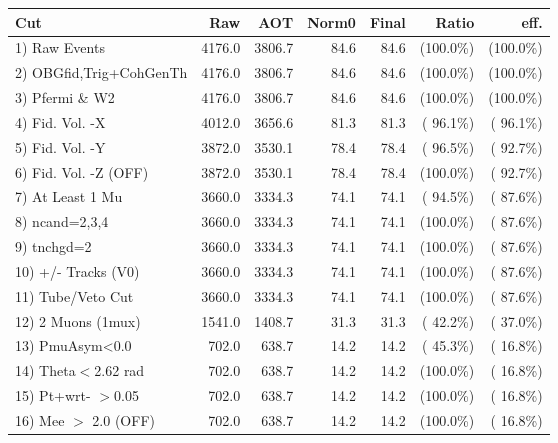  \begin{table}[h!]\centering
 \begin{tabular}{||l||r|r|r|r|r|r||}
 \hline
 \hline
 Cut & Raw & AOT & Norm0 & Final & Ratio & eff.       \\
 \hline
  1) Raw Events           &       4176.0 &       3806.7 &         84.6 &         84.6 & (100.0\%) & (100.0\%) \\
  2) OBGfid,Trig+CohGenTh &       4176.0 &       3806.7 &         84.6 &         84.6 & (100.0\%) & (100.0\%) \\
  3) Pfermi \& W2         &       4176.0 &       3806.7 &         84.6 &         84.6 & (100.0\%) & (100.0\%) \\
  4) Fid. Vol. -X         &       4012.0 &       3656.6 &         81.3 &         81.3 & ( 96.1\%) & ( 96.1\%) \\
  5) Fid. Vol. -Y         &       3872.0 &       3530.1 &         78.4 &         78.4 & ( 96.5\%) & ( 92.7\%) \\
  6) Fid. Vol. -Z (OFF)   &       3872.0 &       3530.1 &         78.4 &         78.4 & (100.0\%) & ( 92.7\%) \\
  7) At Least 1 Mu        &       3660.0 &       3334.3 &         74.1 &         74.1 & ( 94.5\%) & ( 87.6\%) \\
  8) ncand=2,3,4          &       3660.0 &       3334.3 &         74.1 &         74.1 & (100.0\%) & ( 87.6\%) \\
  9) tnchgd=2             &       3660.0 &       3334.3 &         74.1 &         74.1 & (100.0\%) & ( 87.6\%) \\
 10) +/- Tracks (V0)      &       3660.0 &       3334.3 &         74.1 &         74.1 & (100.0\%) & ( 87.6\%) \\
 11) Tube/Veto Cut        &       3660.0 &       3334.3 &         74.1 &         74.1 & (100.0\%) & ( 87.6\%) \\
 12) 2 Muons (1mux)       &       1541.0 &       1408.7 &         31.3 &         31.3 & ( 42.2\%) & ( 37.0\%) \\
 13) PmuAsym<0.0          &        702.0 &        638.7 &         14.2 &         14.2 & ( 45.3\%) & ( 16.8\%) \\
 14) Theta$<$2.62 rad     &        702.0 &        638.7 &         14.2 &         14.2 & (100.0\%) & ( 16.8\%) \\
 15) Pt+wrt- $>$0.05      &        702.0 &        638.7 &         14.2 &         14.2 & (100.0\%) & ( 16.8\%) \\
 16) Mee $>$ 2.0  (OFF)   &        702.0 &        638.7 &         14.2 &         14.2 & (100.0\%) & ( 16.8\%) \\

\end{tabular}
\end{table}
